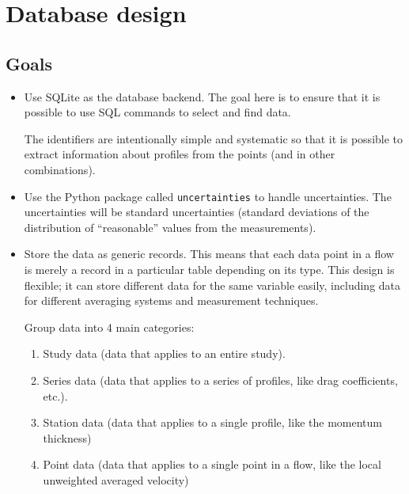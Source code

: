 %
\chapter{Database design}

\section{Goals}

\begin{itemize}

\item

Use SQLite as the database backend.  The goal here is to ensure that it
is possible to use SQL commands to select and find data.

The identifiers are intentionally simple and systematic so that it is possible
to extract information about profiles from the points (and in other
combinations).

\item

Use the Python package called \texttt{uncertainties} to handle uncertainties.
The uncertainties will be standard uncertainties (standard deviations of the
distribution of ``reasonable'' values from the measurements).

\item

Store the data as generic records.  This means that each data point in a flow
is merely a record in a particular table depending on its type.  This design is
flexible; it can store different data for the same variable easily, including
data for different averaging systems and measurement techniques.

Group data into 4 main categories:

    \begin{enumerate}

    \item Study data (data that applies to an entire study).

    \item Series data (data that applies to a series of profiles, like drag
    coefficients, etc.).

    \item Station data (data that applies to a single profile, like the
    momentum thickness)

    \item Point data (data that applies to a single point in a flow, like the
    local unweighted averaged velocity)


\end{enumerate}
\end{itemize}
